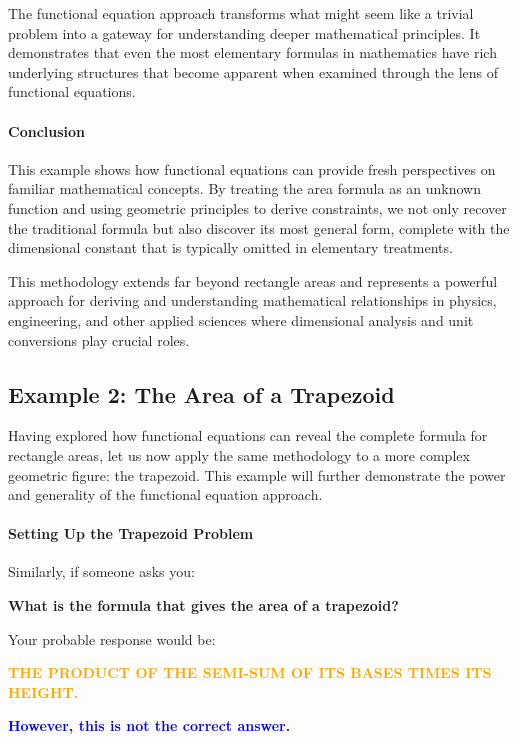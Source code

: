 The functional equation approach transforms what might seem like a trivial problem into a gateway for understanding deeper mathematical principles. It demonstrates that even the most elementary formulas in mathematics have rich underlying structures that become apparent when examined through the lens of functional equations.

\paragraph{Conclusion}
This example shows how functional equations can provide fresh perspectives on familiar mathematical concepts. By treating the area formula as an unknown function and using geometric principles to derive constraints, we not only recover the traditional formula but also discover its most general form, complete with the dimensional constant that is typically omitted in elementary treatments.

This methodology extends far beyond rectangle areas and represents a powerful approach for deriving and understanding mathematical relationships in physics, engineering, and other applied sciences where dimensional analysis and unit conversions play crucial roles.

\subsection{Example 2: The Area of a Trapezoid}

Having explored how functional equations can reveal the complete formula for rectangle areas, let us now apply the same methodology to a more complex geometric figure: the trapezoid. This example will further demonstrate the power and generality of the functional equation approach.

\paragraph{Setting Up the Trapezoid Problem}

Similarly, if someone asks you:

\begin{center}
\textbf{What is the formula that gives the area of a trapezoid?}
\end{center}

Your probable response would be:

\begin{center}
\textcolor{orange}{\textbf{THE PRODUCT OF THE SEMI-SUM OF ITS BASES TIMES ITS HEIGHT.}}

\textcolor{blue}{\textbf{However, this is not the correct answer.}}
\end{center}

